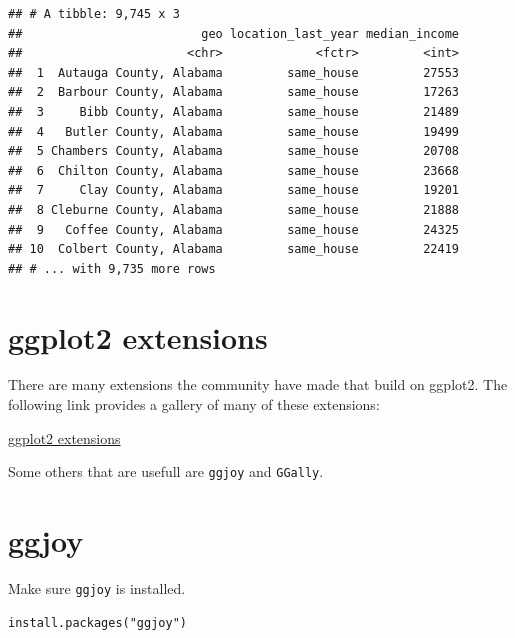 \documentclass[]{book}
\newenvironment{Shaded}{\begin{snugshade}}{\end{snugshade}}
\newcommand{\KeywordTok}[1]{\textcolor[rgb]{0.13,0.29,0.53}{\textbf{{#1}}}}
\newcommand{\DataTypeTok}[1]{\textcolor[rgb]{0.13,0.29,0.53}{{#1}}}
\newcommand{\StringTok}[1]{\textcolor[rgb]{0.31,0.60,0.02}{{#1}}}
\newcommand{\OtherTok}[1]{\textcolor[rgb]{0.56,0.35,0.01}{{#1}}}
\newcommand{\NormalTok}[1]{{#1}}
\theoremstyle{definition}
\theoremstyle{definition}
\theoremstyle{remark}
\begin{document}
\begin{Shaded}
\end{Shaded}

\begin{verbatim}
## # A tibble: 9,745 x 3
##                         geo location_last_year median_income
##                       <chr>             <fctr>         <int>
##  1  Autauga County, Alabama         same_house         27553
##  2  Barbour County, Alabama         same_house         17263
##  3     Bibb County, Alabama         same_house         21489
##  4   Butler County, Alabama         same_house         19499
##  5 Chambers County, Alabama         same_house         20708
##  6  Chilton County, Alabama         same_house         23668
##  7     Clay County, Alabama         same_house         19201
##  8 Cleburne County, Alabama         same_house         21888
##  9   Coffee County, Alabama         same_house         24325
## 10  Colbert County, Alabama         same_house         22419
## # ... with 9,735 more rows
\end{verbatim}

\section{ggplot2 extensions}\label{ggplot2-extensions}

There are many extensions the community have made that build on ggplot2.
The following link provides a gallery of many of these extensions:

\href{http://www.ggplot2-exts.org/gallery}{ggplot2 extensions}

Some others that are usefull are \texttt{ggjoy} and \texttt{GGally}.

\section{ggjoy}\label{ggjoy}

Make sure \texttt{ggjoy} is installed.

\begin{verbatim}
install.packages("ggjoy")
\end{verbatim}
\end{document}
